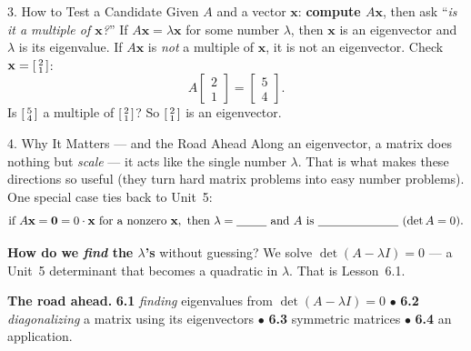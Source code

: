 \documentclass[10pt]{article}
\newcommand{\xx}{\mathbf{x}}
\newcommand{\zero}{\mathbf{0}}
\begin{document}
\begin{notesbox}{3. How to Test a Candidate}
Given $A$ and a vector $\xx$: \textbf{compute $A\xx$}, then ask ``\emph{is it a multiple of $\xx$?}''
If $A\xx=\lambda\xx$ for some number $\lambda$, then $\xx$ is an eigenvector and $\lambda$ is its
eigenvalue. If $A\xx$ is \emph{not} a multiple of $\xx$, it is not an eigenvector. Check
$\xx=\begin{bsmallmatrix} 2\\ 1 \end{bsmallmatrix}$:
\[
  A\begin{bmatrix} 2\\ 1 \end{bmatrix}
  = \begin{bmatrix} 5\\ 4 \end{bmatrix}.
\]
Is $\begin{bsmallmatrix} 5\\ 4 \end{bsmallmatrix}$ a multiple of $\begin{bsmallmatrix} 2\\ 1
\end{bsmallmatrix}$? \blank{1.4cm} \; So $\begin{bsmallmatrix} 2\\ 1 \end{bsmallmatrix}$ is
\blank{2.6cm} an eigenvector.
\end{notesbox}

\begin{notesbox}{4. Why It Matters --- and the Road Ahead}
Along an eigenvector, a matrix does nothing but \emph{scale} --- it acts like the single number
$\lambda$. That is what makes these directions so useful (they turn hard matrix problems into easy
number problems). One special case ties back to Unit~5:
\[
  \text{if } A\xx=\zero=0\cdot\xx \text{ for a nonzero }\xx,\ \text{then }\lambda=\blank{0.9cm}
  \text{ and } A \text{ is }\blank{2.4cm}\ (\det A=0).
\]

\vspace{2pt}
\textbf{How do we \emph{find} the $\lambda$'s} without guessing? We solve $\det(A-\lambda I)=0$ ---
a Unit~5 determinant that becomes a quadratic in $\lambda$. That is Lesson~6.1.

\vspace{2pt}
\textbf{The road ahead.} \textbf{6.1} \emph{finding} eigenvalues from $\det(A-\lambda I)=0$\; $\bullet$\;
\textbf{6.2} \emph{diagonalizing} a matrix using its eigenvectors\; $\bullet$\; \textbf{6.3} symmetric
matrices\; $\bullet$\; \textbf{6.4} an application.
\end{notesbox}
\end{document}
